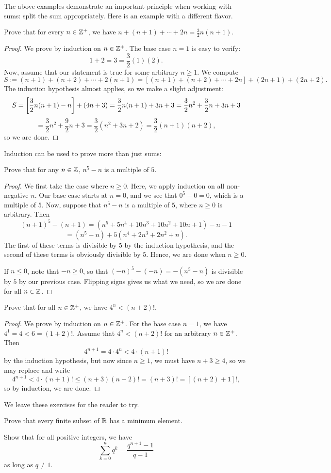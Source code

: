 \documentclass{article}
\begin{document}
The above examples demonstrate an important principle when working with sums: split the sum appropriately. Here is an example with a different flavor.
\begin{example}
Prove that for every $n\in\mathbb Z^+$, we have $n + (n+1) + \cdots + 2n = \frac 32n(n+1)$.
\end{example}
\begin{proof}
We prove by induction on $n\in\mathbb Z^+$. The base case $n=1$ is easy to verify:
$$1 + 2 = 3 = \frac 32(1)(2).$$
Now, assume that our statement is true for some arbitrary $n\geq 1$. We compute  
$$S:=(n+1) + (n+2) + \cdots + 2(n+1) = [(n+1) + (n+2) + \cdots + 2n] + (2n+1) + (2n+2).$$
The induction hypothesis almost applies, so we make a slight adjustment:
$$S = \left[\frac 32n(n+1) - n\right] + (4n+3) = \frac 32n(n+1) + 3n+3 = \frac 32n^2 + \frac 32n + 3n+3$$
$$=\frac 32n^2 + \frac 92n + 3 = \frac 32(n^2 + 3n+2) = \frac 32(n+1)(n+2),$$
so we are done.
\end{proof}
Induction can be used to prove more than just sums:
\begin{example}
Prove that for any $n\in\mathbb Z$, $n^5-n$ is a multiple of $5$.
\end{example}
\begin{proof}
We first take the case where $n\geq 0$. Here, we apply induction on all non-negative $n$. Our base case starts at $n=0$, and we see that $0^5-0 = 0$, which is a multiple of $5$. Now, suppose that $n^5-n$ is a multiple of $5$, where $n\geq 0$ is arbitrary. Then
$$(n+1)^5-(n+1) = (n^5+5n^4+10n^3+10n^2+10n+1) - n-1$$
$$=(n^5-n) + 5(n^4+2n^3+2n^2+n).$$
The first of these terms is divisible by $5$ by the induction hypothesis, and the second of these terms is obviously divisible by $5$. Hence, we are done when $n\geq 0$.

If $n\leq 0$, note that $-n\geq 0$, so that $(-n)^5 - (-n) = -(n^5-n)$ is divisible by $5$ by our previous case. Flipping signs gives us what we need, so we are done for all $n\in\mathbb Z$.
\end{proof}
\begin{example}
Prove that for all $n\in\mathbb Z^+$, we have $4^n < (n+2)!$.
\end{example}
\begin{proof}
We prove by induction on $n\in\mathbb Z^+$. For the base case $n=1$, we have $4^1 = 4 < 6 = (1+2)!$. Assume that $4^n < (n+2)!$ for an arbitrary $n\in\mathbb Z^+$. Then
$$4^{n+1} = 4\cdot 4^n < 4 \cdot (n+1)!$$
by the induction hypothesis, but now since $n \geq 1$, we must have $n+3\geq 4$, so we may replace and write
$$4^{n+1} < 4\cdot (n+1)! \leq (n+3)(n+2)! = (n+3)! = [(n+2)+1]!,$$
so by induction, we are done.
\end{proof}
We leave these exercises for the reader to try.
\begin{exercise}
Prove that every finite subset of $\mathbb R$ has a minimum element.
\end{exercise}
\begin{exercise}
Show that for all positive integers, we have $$\sum_{k=0}^{n} q^k = \frac{q^{n+1}-1}{q-1}$$
as long as $q\neq 1$.
\end{exercise}
 
\end{document}
